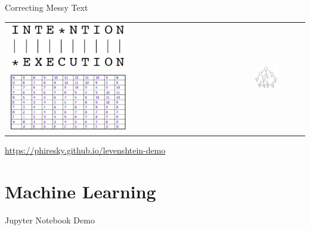 \documentclass[10pt]{beamer}
\begin{document}
\begin{frame}{Correcting Messy Text}

\begin{tabular}{p{5cm} p{7cm}}
    \vspace{0pt}
    \includegraphics[width=0.5\textwidth]{figures/string-alignment.png}
	\vspace{0pt}
    \includegraphics[width=0.5\textwidth]{figures/edit-distance-table.png}
    &
    \vspace{0pt}
    \includegraphics[width=0.5\textwidth]{figures/trie-example.png}
\end{tabular}

\begin{center}
\url{https://phiresky.github.io/levenshtein-demo}
\end{center}

\end{frame}

\section{Machine Learning}

\begin{frame}[fragile]{Jupyter Notebook Demo}

\end{frame}
\end{document}

